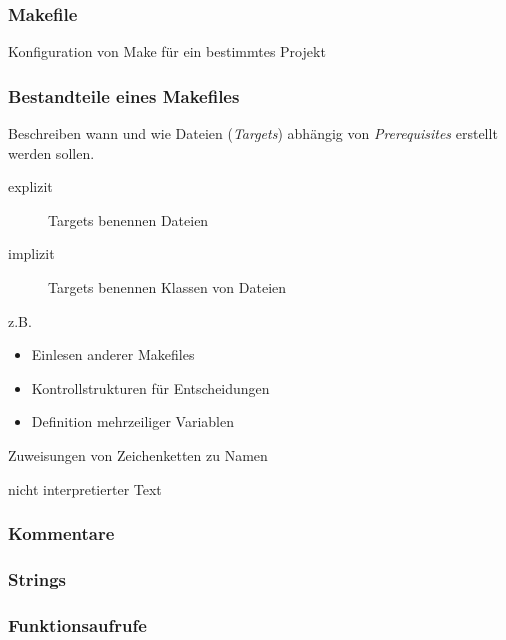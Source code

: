 \begin{frame}
	\frametitle{Makefile}
	Konfiguration von Make für ein bestimmtes Projekt
\end{frame}

\begin{frame}
\frametitle{Bestandteile eines Makefiles}
\begin{description}[Variablendefinitionen] %
	\pause
	\item[Regeln] Beschreiben wann und wie Dateien (\emph{Targets}) abhängig von \emph{Prerequisites} erstellt werden sollen.
		\begin{description}
		\item[explizit] Targets benennen Dateien
		\item[implizit] Targets benennen Klassen von Dateien
		\end{description}
	\pause
	\item[Direktiven] z.B. \begin{itemize}
			\item Einlesen anderer Makefiles
			\item Kontrollstrukturen für Entscheidungen
			\item Definition mehrzeiliger Variablen
		\end{itemize}
	\pause
	\item[Variablendefinitionen] Zuweisungen von Zeichenketten zu Namen
	\pause
	\item[Kommentare] nicht interpretierter Text
\end{description}
\end{frame}

\begin{frame}
	\frametitle{Kommentare}
	
\end{frame}

\begin{frame}
	\frametitle{Strings}
	
\end{frame}

\begin{frame}
	\frametitle{Funktionsaufrufe}
	
\end{frame}


